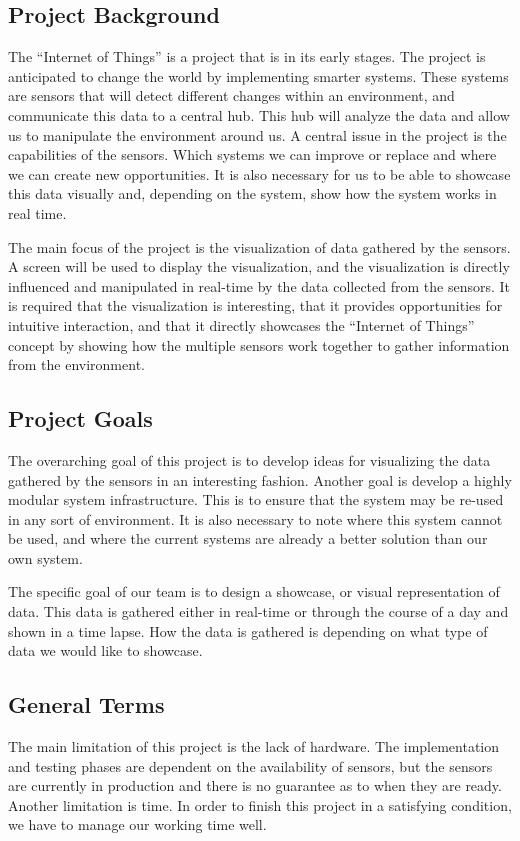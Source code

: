 ﻿\documentclass[../document.tex]{subfiles}
\begin{document}
\subsection*{Project Background}
The ``Internet of Things'' is a project that is in its early stages. The project is anticipated to change the world by implementing smarter systems. These systems are sensors that will detect different changes within an environment, and communicate this data to a central hub. This hub will analyze the data and allow us to manipulate the environment around us. A central issue in the project is the capabilities of the sensors. Which systems we can improve or replace and where we can create new opportunities. It is also necessary for us to be able to showcase this data visually and, depending on the system, show how the system works in real time.

The main focus of the project is the visualization of data gathered by the sensors. A screen will be used to display the visualization, and the visualization is directly influenced and manipulated in real-time by the data collected from the sensors. It is required that the visualization is interesting, that it provides opportunities for intuitive interaction, and that it directly showcases the ``Internet of Things'' concept by showing how the multiple sensors work together to gather information from the environment.

\subsection*{Project Goals}
The overarching goal of this project is to develop ideas for visualizing the data gathered by the sensors in an interesting fashion. Another goal is develop a highly modular system infrastructure. This is to ensure that the system may be re-used in any sort of environment. It is also necessary to note where this system cannot be used, and where the current systems are already a better solution than our own system.

The specific goal of our team is to design a showcase, or visual representation of data. This data is gathered either in real-time or through the course of a day and shown in a time lapse. How the data is gathered is depending on what type of data we would like to showcase. 

\subsection*{General Terms}
The main limitation of this project is the lack of hardware. The implementation and testing phases are dependent on the availability of sensors, but the sensors are currently in production and there is no guarantee as to when they are ready. Another limitation is time. In order to finish this project in a satisfying condition, we have to manage our working time well.
\end{document}
